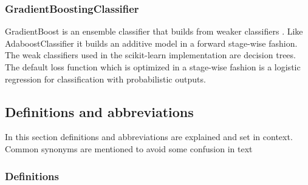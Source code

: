 \documentclass[a4paper,10pt]{article}
\begin{document}
\subsubsection{GradientBoostingClassifier}
GradientBoost is an ensemble classifier that builds from weaker classifiers \cite{GradientBoost}. Like AdaboostClassifier it builds an additive model in a forward stage-wise fashion.  The weak classifiers used in the scikit-learn implementation are decision trees. The default loss function which is optimized in a stage-wise fashion is a logistic regression for classification with probabilistic outputs\cite{Greedy-GBC}.



\subsection{Definitions and abbreviations}
In this section definitions and abbreviations are explained and set in context. Common synonyms are mentioned to avoid some confusion in text
\subsubsection{Definitions}
\end{document}
